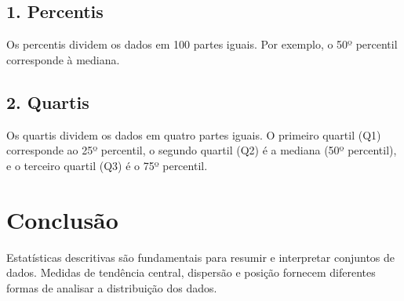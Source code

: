 \documentclass{article}
\begin{document}
\subsection*{1. Percentis}
Os percentis dividem os dados em 100 partes iguais. Por exemplo, o 50º percentil corresponde à mediana.

\subsection*{2. Quartis}
Os quartis dividem os dados em quatro partes iguais. O primeiro quartil (Q1) corresponde ao 25º percentil, o segundo quartil (Q2) é a mediana (50º percentil), e o terceiro quartil (Q3) é o 75º percentil.

\section*{Conclusão}
Estatísticas descritivas são fundamentais para resumir e interpretar conjuntos de dados. Medidas de tendência central, dispersão e posição fornecem diferentes formas de analisar a distribuição dos dados.
\end{document}
